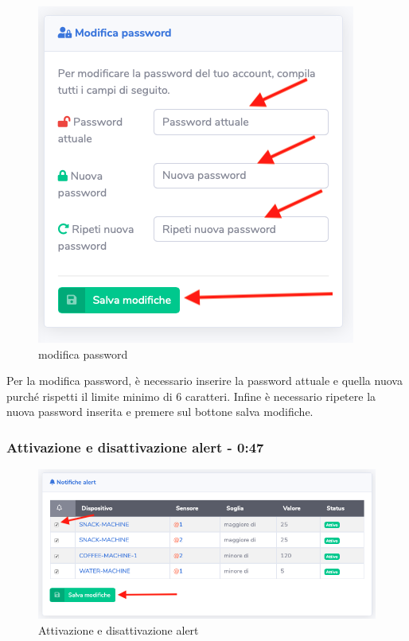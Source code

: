 		\begin{figure}[H]
		\centering
		\includegraphics[scale=0.600]{res/images/membro/modPassword.png}
		\caption{modifica password}
	\end{figure}


		Per la modifica password, è necessario inserire la password attuale e quella nuova purché rispetti il limite minimo di 6 caratteri.
		Infine è necessario ripetere la nuova password inserita e premere sul bottone salva modifiche.

	\subsubsection{Attivazione e disattivazione alert - 0:47}

		\begin{figure}[H]
		\centering
		\includegraphics[scale=0.600]{res/images/membro/attDisattAlert.png}
		\caption{Attivazione e disattivazione alert}
	\end{figure}

